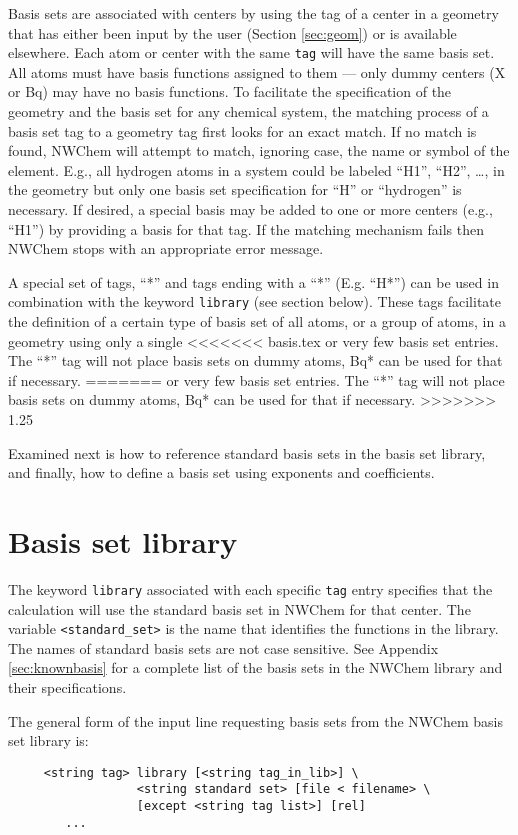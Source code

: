 Basis sets are associated with centers by using the tag of a center in
a geometry that has either been input by the user (Section
\ref{sec:geom}) or is available elsewhere.  Each atom or center with
the same \verb+tag+ will have the same basis set.  All atoms must have
basis functions assigned to them --- only dummy centers (X or Bq) may have no
basis functions.  To facilitate the specification of the geometry and
the basis set for any chemical system, the matching process of a basis
set tag to a geometry tag first looks for an exact match.  If no match
is found, NWChem will attempt to match, ignoring case, the name or
symbol of the element.  E.g., all hydrogen atoms in a system could be
labeled ``H1'', ``H2'', \ldots, in the geometry but only
one basis set specification for ``H'' or ``hydrogen'' is necessary.
If desired, a special basis may be added to one or more centers (e.g.,
``H1'') by providing a basis for that tag.
If the matching mechanism fails then NWChem stops with an appropriate
error message.

A special set of tags, ``*'' and tags ending with a ``*'' (E.g. ``H*'')
can be used in combination with the keyword \verb+library+ (see section
below). These tags facilitate the definition of a certain type of basis 
set of all atoms, or a group of atoms, in a geometry using only a single 
<<<<<<< basis.tex
or very few basis set entries. The ``*'' tag will not place basis sets 
on dummy atoms, Bq* can be used for that if necessary.
=======
or very few basis set entries. The ``*'' tag will not place basis sets 
on dummy atoms, Bq* can be used for that if necessary. 
>>>>>>> 1.25

Examined next is how to reference standard basis sets in the basis set
library, and finally, how to define a basis set using exponents and
coefficients.

\section{Basis set library}

The keyword \verb+library+ associated with each specific \verb+tag+
entry specifies that the calculation will use the standard basis set
in NWChem for that center.  The variable \verb+<standard_set>+ is the
name that identifies the functions in the library.  The names of
standard basis sets are not case sensitive.  See Appendix
\ref{sec:knownbasis} for a complete list of the basis sets in the
NWChem library and their specifications.  

The general form of the input line requesting basis sets from the NWChem
basis set library is:
\begin{verbatim}
     <string tag> library [<string tag_in_lib>] \
                  <string standard set> [file < filename> \
                  [except <string tag list>] [rel]
        ...
\end{verbatim}

